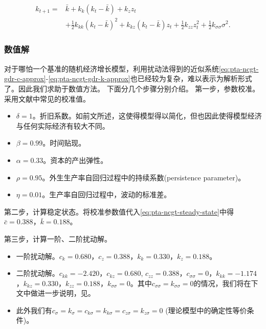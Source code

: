 \begin{equation}
  \label{eq:pta-ncgt-gdr-k-approx}
\begin{split}
    k_{t+1} =& \bar{k} + k_k \left( k_t - \bar{k} \right) + k_z z_t \\
    &+\frac{1}{2} k_{kk} \left( k_t - \bar{k} \right)^2 + k_{kz} \left( k_t - \bar{k} \right) z_t + \frac{1}{2} k_{zz} z_t^2 + \frac{1}{2} k_{\sigma \sigma} \sigma^2.
\end{split}
\end{equation}

\subsubsection{数值解}
对于哪怕一个基准的随机经济增长模型，利用扰动法得到的近似系统\eqref{eq:pta-ncgt-gdr-c-approx}-\eqref{eq:pta-ncgt-gdr-k-approx}也已经较为复杂，难以表示为解析形式了。因此我们求助于数值方法。 下面分几个步骤分别介绍。
第一步，参数校准。采用文献中常见的校准值。
\begin{itemize}
  \item $\delta =1$。折旧系数。如前文所述，这使得模型得以简化，但也因此使得模型经济与任何实际经济有较大不同。
  \item $\beta = 0.99$。时间贴现。
  \item $\alpha = 0.33$。资本的产出弹性。
  \item $\rho = 0.95$。外生生产率自回归过程中的持续系数(persistence parameter)。
  \item $\eta = 0.01$。生产率自回归过程中，波动的标准差。
\end{itemize}

第二步，计算稳定状态。将校准参数值代入\eqref{eq:pta-ncgt-steady-state}中得$\bar{c}=0.388$，$\bar{k}=0.188$。

第三步，计算一阶、二阶扰动解。
\begin{itemize}
  \item 一阶扰动解。$c_k = 0.680$，$c_z = 0.388$，$k_k = 0.330$，$k_z = 0.188$。
  \item 二阶扰动解。$c_{kk} = -2.420$，$c_{kz} = 0.680$, $c_{zz}=0.388$，$c_{\sigma \sigma} = 0$，$k_{kk} = -1.174$，$k_{kz}=0.330$，$k_{zz}=0.188$，$k_{\sigma \sigma} = 0$。其中$c_{\sigma \sigma} = k_{\sigma \sigma} = 0$的情况，我们将在下文中做进一步说明，见。
  \item 此外我们有$c_{\sigma} = k_{\sigma} = c_{k\sigma} = k_{k \sigma} = c_{z \sigma} = k_{z \sigma} = 0$ (理论模型中的确定性等价条件)。
\end{itemize}

